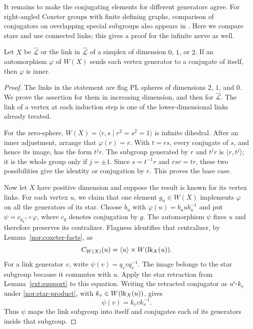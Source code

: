 It remains to make the conjugating elements for different
generators agree.  For right-angled Coxeter groups with finite
defining graphs,
comparison of conjugators on overlapping special subgroups
also appears in \cite[Section~4]{GutierrezKaul2008}.  Here we
compare stars and use connected links; this gives a proof for
the infinite nerve as well.

\begin{lemma}\label{nor:conjugating}
Let $X$ be $\widehat{\mathcal L}$ or the link in
$\widehat{\mathcal L}$ of a simplex of dimension $0$, $1$, or
$2$.  If an automorphism $\varphi$ of $W(X)$ sends each vertex
generator to a conjugate of itself, then $\varphi$ is inner.
\end{lemma}

\begin{proof}
The links in the statement are flag PL spheres of dimensions
$2$, $1$, and $0$.  We prove the assertion for them in
increasing dimension, and then for $\widehat{\mathcal L}$.
The link of a vertex at each induction step is one of the
lower-dimensional links already treated.

For the zero-sphere,
$W(X)=\langle r,s\mid r^2=s^2=1\rangle$ is infinite dihedral.
After an inner adjustment, arrange that $\varphi(r)=r$.
With $t=rs$, every conjugate of $s$, and hence its image,
has the form $t^j r$.
The subgroup generated by $r$ and $t^j r$ is
$\langle r,t^j\rangle$; it is the whole group only if
$j=\pm1$.  Since $s=t^{-1}r$ and $rsr=tr$, these two
possibilities give the identity or conjugation by $r$.
This proves the base case.

Now let $X$ have positive dimension and suppose the result is
known for its vertex links.  For each vertex $u$, we claim that
one element $g_u\in W(X)$ implements $\varphi$ on all the
generators of its star.  Choose $b_u$ with
$\varphi(u)=b_u u b_u^{-1}$ and put
$\psi=c_{b_u^{-1}}\circ\varphi$, where $c_g$ denotes
conjugation by $g$.  The automorphism $\psi$ fixes $u$ and
therefore preserves its centralizer.  Flagness identifies that
centralizer, by Lemma~\ref{nor:coxeter-facts}, as
\begin{equation}\label{nor:star-product}
 C_{W(X)}(u)
   =\langle u\rangle\times W(\operatorname{lk}_X(u)).
\end{equation}
For a link generator $v$, write $\psi(v)=q_v v q_v^{-1}$.
The image belongs to the star subgroup because it commutes
with $u$.  Apply the star retraction from
Lemma~\ref{ext:support} to this equation.  Writing the
retracted conjugator as $u^{\epsilon_v}k_v$ under
\eqref{nor:star-product}, with $k_v\in W(\operatorname{lk}_X(u))$, gives
\[
 \psi(v)=k_v v k_v^{-1}.
\]
Thus $\psi$ maps the link subgroup into itself and conjugates
each of its generators inside that subgroup.


\end{proof}
